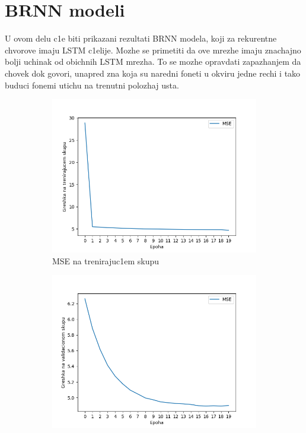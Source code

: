 \documentclass[a4paper, openany, oneside, 11pt]{book}
\begin{document}
\section[$BRNN$ modeli]{$\mathbf{BRNN}$ modeli}
U ovom delu c1e biti prikazani rezultati \acrshort{BRNN} modela, koji za rekurentne chvorove imaju \acrshort{LSTM} c1elije. Mozhe se primetiti da ove mrezhe imaju znachajno bolji uchinak od obichnih \acrshort{LSTM} mrezha. To se mozhe opravdati zapazhanjem da chovek dok govori, unapred zna koja su naredni foneti u okviru jedne rechi i tako buduci fonemi utichu na trenutni polozhaj usta. 
\newpage
\begin{figure}[!h]
        \centering
        \begin{subfigure}{0.475\textwidth}
            \centering
            \includegraphics[scale=0.45]{res/BidirectSingleLayerLSTM_30units_train.png}
            \caption{\acrshort{MSE} na trenirajuc1em skupu}
            \label{fig:4_6a}
            \vspace{0pt}
        \end{subfigure}%
        \begin{subfigure}{0.475\textwidth}
            \centering
            \includegraphics[scale=0.45]{res/SingleLayerLSTM_30units_validation.png}

\end{subfigure}
\end{figure}
\end{document}
